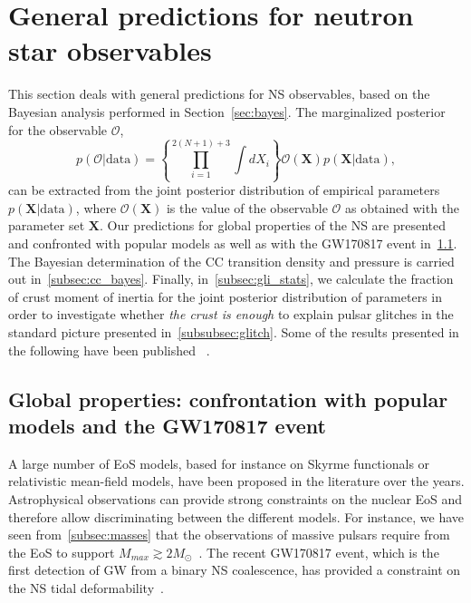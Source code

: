 \section{General predictions for neutron star observables}\label{sec:general}

This section deals with general predictions for NS observables, based on the
Bayesian analysis performed in Section~\ref{sec:bayes}. The marginalized
posterior for the observable $\mathcal{O}$,
%
\begin{equation}
  p(\mathcal{O}|\text{data}) = \left\{\prod_{i=1}^{2(N+1)+3}\int
  dX_i\right\}\mathcal{O}(\bm{X})p(\bm{X}|\text{data}),\label{eq:margobs}
\end{equation}
%
can be extracted from the joint posterior distribution of empirical parameters
$p(\bm{X}|\text{data})$, where $\mathcal{O}(\bm{X})$ is the value of the
observable $\mathcal{O}$ as obtained with the parameter set $\bm{X}$.
Our predictions for global properties of the NS are presented and confronted 
with popular models as well as with the GW170817 event in~\ref{subsec:gw17}. 
The Bayesian determination of the CC transition density and pressure is carried 
out in~\ref{subsec:cc_bayes}.
Finally, in~\ref{subsec:gli_stats}, we calculate the fraction of crust moment
of inertia for the joint posterior distribution of parameters in order to 
investigate whether \textit{the crust is enough} to explain pulsar glitches in 
the standard picture presented in~\ref{subsubsec:glitch}. 
{Some of the results presented in the following have been published
~\cite{Carreau2019cc,Carreau2019moi}.}

\subsection{Global properties: confrontation with popular models and the 
GW170817 event}\label{subsec:gw17}

A large number of EoS models, based for instance on Skyrme functionals or 
relativistic mean-field models, have been proposed in the literature over the 
years. Astrophysical observations can provide strong constraints on the
nuclear EoS  and therefore allow discriminating between the different models. 
For instance, we have seen from~\ref{subsec:masses} that the observations of 
massive pulsars require from the EoS to support $M_{max} \gtrsim
2M_\odot$~\cite{Demorest2010,Antoniadis2013,Cromartie2020}.
The recent GW170817 event, which is the first detection of GW from a 
binary NS coalescence, has provided a constraint on the NS tidal 
deformability~\cite{GWtidal,GW1,GW2}.

